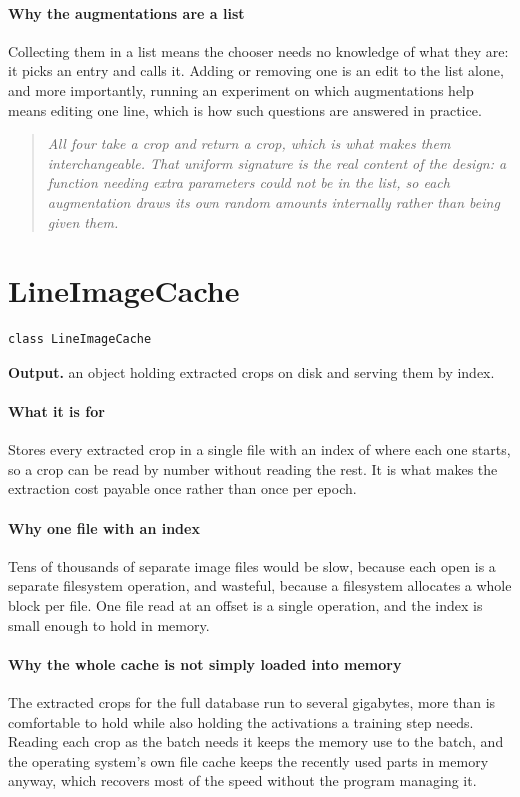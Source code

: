 \paragraph{Why the augmentations are a list}
Collecting them in a list means the chooser needs no knowledge of what they are: it picks an entry and calls it. Adding or removing one is an edit to the list alone, and more importantly, running an experiment on which augmentations help means editing one line, which is how such questions are answered in practice.


\begin{quote}\small\itshape All four take a crop and return a crop, which is what makes them interchangeable. That uniform signature is the real content of the design: a function needing extra parameters could not be in the list, so each augmentation draws its own random amounts internally rather than being given them.\end{quote}

\section{LineImageCache}
\begin{lstlisting}[style=sig]
class LineImageCache
\end{lstlisting}

\noindent\textbf{Output.} an object holding extracted crops on disk and serving them by index.


\paragraph{What it is for}
Stores every extracted crop in a single file with an index of where each one starts, so a crop can be read by number without reading the rest. It is what makes the extraction cost payable once rather than once per epoch.


\paragraph{Why one file with an index}
Tens of thousands of separate image files would be slow, because each open is a separate filesystem operation, and wasteful, because a filesystem allocates a whole block per file. One file read at an offset is a single operation, and the index is small enough to hold in memory.


\paragraph{Why the whole cache is not simply loaded into memory}
The extracted crops for the full database run to several gigabytes, more than is comfortable to hold while also holding the activations a training step needs. Reading each crop as the batch needs it keeps the memory use to the batch, and the operating system's own file cache keeps the recently used parts in memory anyway, which recovers most of the speed without the program managing it.


